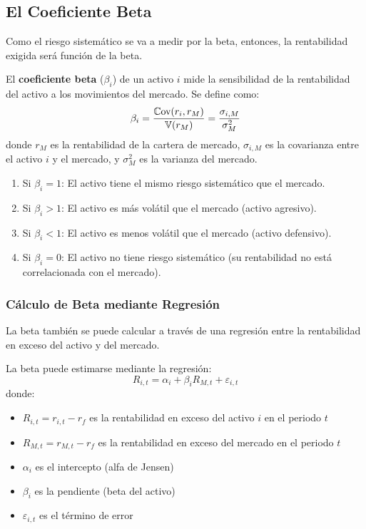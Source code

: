 \subsection{El Coeficiente Beta}

Como el riesgo sistemático se va a medir por la beta, entonces, la rentabilidad exigida será función de la beta.

\begin{definicion}
El \textbf{coeficiente beta} ($\beta_i$) de un activo $i$ mide la sensibilidad de la rentabilidad del activo a los movimientos del mercado. Se define como:
\begin{equation}
\beta_i = \frac{\mathbb{C}\text{ov}(r_i, r_M)}{\mathbb{V}(r_M)} = \frac{\sigma_{i,M}}{\sigma_M^2}
\end{equation}
donde $r_M$ es la rentabilidad de la cartera de mercado, $\sigma_{i,M}$ es la covarianza entre el activo $i$ y el mercado, y $\sigma_M^2$ es la varianza del mercado.
\end{definicion}

\begin{proposicion}
\begin{enumerate}
\item Si $\beta_i = 1$: El activo tiene el mismo riesgo sistemático que el mercado.
\item Si $\beta_i > 1$: El activo es más volátil que el mercado (activo agresivo).
\item Si $\beta_i < 1$: El activo es menos volátil que el mercado (activo defensivo).
\item Si $\beta_i = 0$: El activo no tiene riesgo sistemático (su rentabilidad no está correlacionada con el mercado).
\end{enumerate}
\end{proposicion}

\subsubsection{Cálculo de Beta mediante Regresión}

La beta también se puede calcular a través de una regresión entre la rentabilidad en exceso del activo y del mercado.

\begin{proposicion}
La beta puede estimarse mediante la regresión:
\begin{equation}
R_{i,t} = \alpha_i + \beta_i R_{M,t} + \varepsilon_{i,t}
\end{equation}
donde:
\begin{itemize}
\item $R_{i,t} = r_{i,t} - r_f$ es la rentabilidad en exceso del activo $i$ en el periodo $t$
\item $R_{M,t} = r_{M,t} - r_f$ es la rentabilidad en exceso del mercado en el periodo $t$
\item $\alpha_i$ es el intercepto (alfa de Jensen)
\item $\beta_i$ es la pendiente (beta del activo)
\item $\varepsilon_{i,t}$ es el término de error
\end{itemize}
\end{proposicion}

